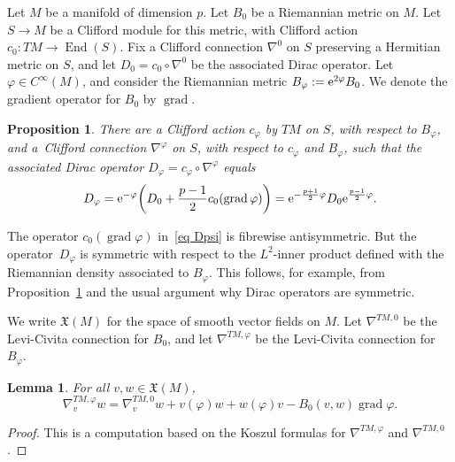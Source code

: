 \documentclass[pdftex]{sigma}%
\numberwithin{equation}{section}
\newtheorem{Lemma}[Theorem]{Lemma}
\newtheorem{Proposition}[Theorem]{Proposition}
 { \theoremstyle{definition}
\newtheorem{Definition}[Theorem]{Definition}
\newtheorem{Note}[Theorem]{Note}
\newtheorem{Example}[Theorem]{Example}
\newtheorem{Remark}[Theorem]{Remark} }
\DeclareMathOperator{\grad}{grad}
\DeclareMathOperator{\End}{End}
\newcommand{\XX}{\mathfrak{X}}
\begin{document}
Let $M$ be a manifold of dimension $p$. Let $B_0$ be a Riemannian metric on $M$. Let $S \to M$ be a Clifford module for this metric, with Clifford action $c_0\colon TM \to \End(S)$. Fix a Clifford connection $\nabla^0$ on $S$ preserving a Hermitian metric on $S$, and let $D_0 = c_0\circ \nabla^0$ be the associated Dirac operator. Let $\varphi \in C^{\infty}(M)$, and consider the Riemannian metric $B_{\varphi} := {\rm e}^{2\varphi}B_0$. We denote the gradient operator for $B_0$ by $\grad$.
\begin{Proposition}\label{prop Dirac psi}
There are a Clifford action $c_{\varphi}$ by $TM$ on $S$, with respect to $B_{\varphi}$, and a~Clifford connection $\nabla^{\varphi}$ on $S$, with respect to $c_{\varphi}$ and $B_{\varphi}$, such that the associated Dirac operator $D_{\varphi} = c_{\varphi} \circ \nabla^{\varphi}$ equals
\begin{equation} \label{eq Dpsi}
D_{\varphi} = {\rm e}^{-\varphi}\bigg( D_0 + \frac{p-1}{2} c_0(\grad\varphi) \bigg) = {\rm e}^{-\frac{p+1}{2}\varphi} D_0 {\rm e}^{\frac{p-1}{2}\varphi}.
\end{equation}
\end{Proposition}
\begin{Remark}
The operator $c_0(\grad\varphi)$ in~\eqref{eq Dpsi} is fibrewise antisymmetric. But the operator~$D_{\varphi}$ is symmetric with respect to the $L^2$-inner product defined with the Riemannian density associated to $B_{\varphi}$. This follows, for example, from Proposition~\ref{prop Dirac psi} and the usual argument why Dirac operators are symmetric.
\end{Remark}

We write $\XX(M)$ for the space of smooth vector fields on $M$.
Let $\nabla^{TM, 0}$ be the Levi-Civita connection for $B_0$, and let $\nabla^{TM, \varphi}$ be the Levi-Civita connection for $B_{\varphi}$.
\begin{Lemma}\label{lem LC psi}
For all $v,w \in \XX(M)$,
\[
\nabla^{TM, \varphi}_v w = \nabla^{TM, 0}_v w + v(\varphi) w + w(\varphi)v -B_0(v,w)\grad \varphi.
\]
\end{Lemma}
\begin{proof}
This is a computation based on the
Koszul formulas for $\nabla^{TM, \varphi}$ and $\nabla^{TM, 0}$.
\end{proof}
\end{document}
